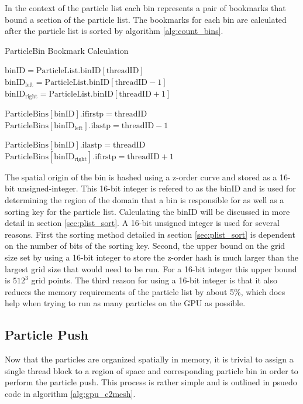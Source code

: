 In the context of the particle list each bin represents a pair of bookmarks that bound a section of the particle list. The bookmarks for each bin are calculated after the particle list is sorted by algorithm \ref{alg:count_bins}.

\begin{algorithm}
	\caption{ParticleBin Bookmark Calculation}
	\label{alg:count_bins}
	\begin{algorithmic}
			\STATE 
			\STATE $\mathrm{binID} = \mathrm{ParticleList.binID}[\mathrm{threadID}]$
			\STATE $\mathrm{binID_{left}} = \mathrm{ParticleList.binID}[\mathrm{threadID} - 1]$
			\STATE $\mathrm{binID_{right}} = \mathrm{ParticleList.binID}[\mathrm{threadID} + 1]$
			
				\STATE $\mathrm{ParticleBins[binID].ifirstp} = \mathrm{threadID}$
				\STATE $\mathrm{ParticleBins[binID_{left}].ilastp} = \mathrm{threadID} - 1$
			\ENDIF

				\STATE $\mathrm{ParticleBins[binID].ilastp} = \mathrm{threadID}$
				\STATE $\mathrm{ParticleBins[binID_{right}].ifirstp} = \mathrm{threadID} + 1$	
			\ENDIF
			
		\ENDFOR
	\end{algorithmic}
\end{algorithm}


The spatial origin of the bin is hashed using a z-order curve and stored as a 16-bit unsigned-integer. This 16-bit integer is refered to as the binID and is used for determining the region of the domain that a bin is responsible for as well as a sorting key for the particle list. Calculating the binID will be discussed in more detail in section \ref{sec:plist_sort}. A 16-bit unsigned integer is used for several reasons. First the sorting method detailed in section \ref{sec:plist_sort} is dependent on the number of bits of the sorting key. Second, the upper bound on the grid size set by using a 16-bit integer to store the z-order hash is much larger than the largest grid size that would need to be run. For a 16-bit integer this upper bound is $512^3$ grid points. The third reason for using a 16-bit integer is that it also reduces the memory requirements of the particle list by about 5\%, which does help when trying to run as many particles on the GPU as possible. 

	\subsection{Particle Push}
Now that the particles are organized spatially in memory, it is trivial to assign a single thread block to a region of space and corresponding particle bin in order to perform the particle push. This process is rather simple and is outlined in psuedo code in algorithm \ref{alg:gpu_c2mesh}. 

